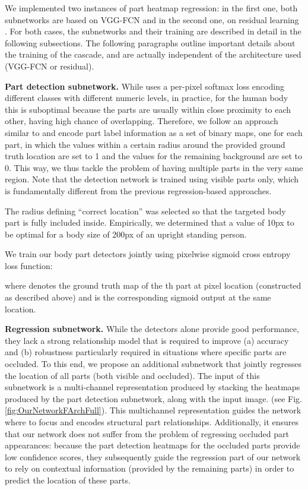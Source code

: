 \documentclass[runningheads]{llncs}
\begin{document}
We implemented two instances of part heatmap regression: in the first one, both subnetworks are based on VGG-FCN \cite{simonyan2014very, long2015fully} and in the second one, on residual learning \cite{he2016deep, newell2016stacked}. For both cases, the subnetworks and their training are described in detail in the following subsections. The following paragraphs outline important details about the training of the cascade, and are actually independent of the architecture used (VGG-FCN or residual). 

\textbf{Part detection subnetwork.} While \cite{long2015fully} uses a per-pixel softmax loss encoding different classes with different numeric levels, in practice, for the human body this is suboptimal because the parts are usually within close proximity  to each other, having high chance of overlapping. Therefore, we follow an approach similar to \cite{zhang2015fine} and encode part label information as a set of  binary maps, one for each part, in which the values within a certain radius around the provided ground truth location are set to 1 and the values for the remaining background are set to 0. This way, we thus tackle the problem of having multiple parts in the very same region. Note that the detection network is trained using visible parts only, which is fundamentally different from the previous regression-based approaches\cite{pfister2015flowing,tompson2014joint,tompson2015efficient}.

The radius defining ``correct location'' was selected so that the targeted body part is fully included inside. Empirically, we determined that a value of 10px to be optimal for a body size of 200px of an upright standing person.

We train our body part detectors jointly using pixelwise sigmoid cross entropy loss function:


where  denotes the ground truth map of the th part at pixel location  (constructed as described above) and  is the corresponding sigmoid output at the same location.

\textbf{Regression subnetwork.} While the detectors alone provide good performance, they lack a strong relationship model that is required to improve (a) accuracy and (b) robustness particularly required in situations where specific parts are occluded. To this end, we propose an additional subnetwork that jointly regresses the location of all parts (both visible and occluded). The input of this subnetwork is a multi-channel representation produced by stacking the  heatmaps produced by the part detection subnetwork, along with the input image. (see Fig. \ref{fig:OurNetworkFArchFull}). This multichannel representation guides the network where to focus and encodes structural part relationships. Additionally, it ensures that our network does not suffer from the problem of regressing occluded part appearances: because the part detection heatmaps for the occluded parts provide low confidence scores, they subsequently guide the regression part of our network to rely on contextual information (provided by the remaining parts) in order to predict the location of these parts. 
\end{document}
